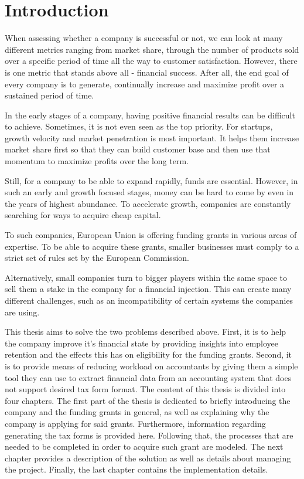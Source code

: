 \documentclass[12pt,oneside]{fithesis2}
\begin{document}
    \chapter{Introduction}
    When assessing whether a company is successful or not, we can look at many different metrics ranging from market share, through the number of products sold over a specific period of time all the way to customer satisfaction. However, there is one metric that stands above all  - financial success. After all, the end goal of every company is to generate, continually increase and maximize profit over a sustained period of time.
    \par
    In the early stages of a company, having positive financial results can be difficult to achieve. Sometimes, it is not even seen as the top priority. For startups, growth velocity and market penetration is most important. It helps them increase market share first so that they can build customer base and then use that momentum to maximize profits over the long term.
    \par
    Still, for a company to be able to expand rapidly, funds are essential. However, in such an early and growth focused stages, money can be hard to come by even in the years of highest abundance. To accelerate growth, companies are constantly searching for ways to acquire cheap capital.
    \par
    To such companies, European Union is offering funding grants in various areas of expertise. To be able to acquire these grants, smaller businesses must comply to a strict set of rules set by the European Commission.
    \par
    Alternatively, small companies turn to bigger players within the same space to sell them a stake in the company for a financial injection. This can create many different challenges, such as an incompatibility of certain systems the companies are using.
    \par
    This thesis aims to solve the two problems described above. First, it is to help the company improve it's financial state by providing insights into employee retention and the effects this has on eligibility for the funding grants. Second, it is to provide means of reducing workload on accountants by giving them a simple tool they can use to extract financial data from an accounting system that does not support desired tax form format.
    \newpage
    The content of this thesis is divided into four chapters. The first part of the thesis is dedicated to briefly introducing the company and the funding grants in general, as well as explaining why the company is applying for said grants. Furthermore, information regarding generating the tax forms is provided here. Following that, the processes that are needed to be completed in order to acquire such grant are modeled. The next chapter provides a description of the solution as well as details about managing the project. Finally, the last chapter contains the implementation details.
\end{document}
